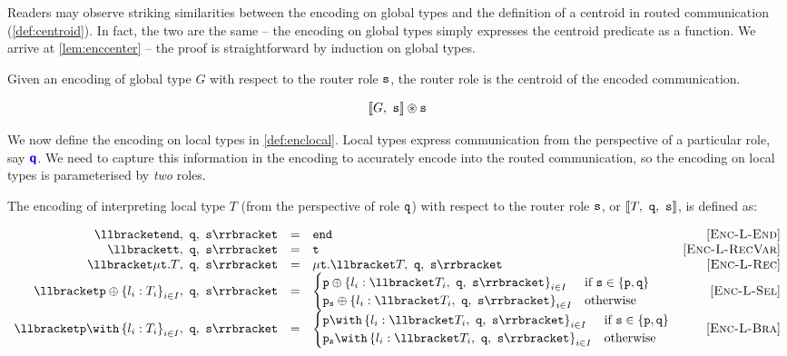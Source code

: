 Readers may observe striking similarities between
the encoding on global types and the definition of a
centroid in routed communication (\cref{def:centroid}).
In fact, the two are the same -- the encoding on global
types simply expresses the centroid predicate as a function.
We arrive at \cref{lem:enccenter} -- the proof is straightforward
by induction on global types.

\begin{lemma}
Given an encoding of global type $G$ with respect to the
router role ${\mathtt{s}}$,
the router role is the centroid of the encoded communication.

\[
{\llbracket {G},~{\mathtt{s}} \rrbracket} \circledast {\mathtt{s}}
\]

\label{lem:enccenter}
\end{lemma}

We now define the encoding on local types in \cref{def:enclocal}.
Local types express communication from the perspective of a 
particular role, say ${\color{blue}\bm{\mathsf{q}}}$. 
We need to capture this information in the encoding
to accurately encode into the routed communication,
so the encoding on local types is parameterised by
\textit{two} roles.

\begin{definition}
The encoding of interpreting local type $T$ (from the
perspective of role ${\mathtt{q}}$) with respect to
the router role ${\mathtt{s}}$, or $\llbracket {T},~{\mathtt{q}},~{\mathtt{s}} \rrbracket$, is defined as:

\doublespacing
\[
\begin{array}{rclr}
\enclocal{\tend}{q}{s} &= & \tend & \rulename{Enc-L-End} \\
\enclocal{\trecvar}{q}{s} &= & \trecvar & \rulename{Enc-L-RecVar} \\
\enclocal{\trec{T}}{q}{s} &= & \trec{\enclocal{T}{q}{s}} 
	& \rulename{Enc-L-Rec} \\
\enclocal{\tsel{p}{l_i: T_i}{i\in I}}{q}{s} &= 
	& \begin{cases}
	\tsel{p}{l_i: \enclocal{T_i}{q}{s}}{i\in I}
		& \text{if } \mrole{s} \in \{ \mrole{p}, \mrole{q} \} \\
	\tselproxy{p}{s}{l_i: \enclocal{T_i}{q}{s}}{i\in I}
		& \text{otherwise} \\	
	\end{cases}
	& \rulename{Enc-L-Sel} \\
\enclocal{\tbra{p}{l_i: T_i}{i\in I}}{q}{s} &= 
	& \begin{cases}
	\tbra{p}{l_i: \enclocal{T_i}{q}{s}}{i\in I}
		& \text{if } \mrole{s} \in \{ \mrole{p}, \mrole{q} \} \\
	\tbraproxy{p}{s}{l_i: \enclocal{T_i}{q}{s}}{i\in I}
		& \text{otherwise} \\	
	\end{cases}
	& \rulename{Enc-L-Bra} \\
\end{array}
\]
\singlespacing

\label{def:enclocal}
\end{definition}

